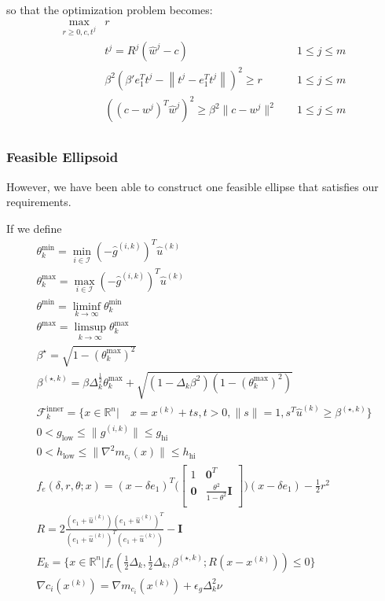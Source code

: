\documentclass{article}
\theoremstyle{case}
\newcommand{\dk}{\Delta_k}
\newcommand{\xk}{{x^{(k)}}}
\newcommand{\gik}{{g^{(i, k)}}}
\newcommand{\hgik}{{{\hat g}^{(i, k)}}}
\newcommand{\huk}{{{\hat u}^{(k)}}}
\newcommand{\bsk}{{\beta^{(\star, k)}}}
\newcommand{\bs}{{\beta^{\star}}}
\newcommand{\fcki}{{\mathcal {F}^{\text{inner}}_k}}
\newcommand{\rn}{{\mathbb R^{n}}}
\begin{document}
so that the optimization problem becomes:
\begin{align*}
\max_{r \ge 0, c, t^j}	& r & \\
					& t^j = R^j({\hat w}^j - c) 																		& \quad 1 \le j \le m \\
					& \beta^2 \left(\beta' e_1^T t^j - \left\|t^j - e_1^T t^j\right\|\right)^2 \ge r			& \quad 1 \le j \le m \\
					& \left(\left(c - w^j\right)^T\hat w^j\right)^2 \ge \beta^2 \|c - w^j\|^2											& \quad 1 \le j \le m \\
\end{align*}


\subsubsection{Feasible Ellipsoid}

However, we have been able to construct one feasible ellipse that satisfies our requirements.

If we define
\begin{align}
\theta^{\text{min}}_k = \min_{i \in \mathcal I} (-\hgik)^T \huk \label{def_theta_k_min} \\
\theta^{\text{max}}_k = \max_{i \in \mathcal I} (-\hgik)^T \huk \label{def_theta_k_max} \\
\theta^{\text{min}} = \liminf_{k\to\infty} \theta^{\text{min}}_k \label{def_theta_min} \\
\theta^{\text{max}} = \limsup_{k\to\infty} \theta^{\text{max}}_k \label{def_theta_max} \\
\bs = \sqrt{ 1 - (\theta^{\text{max}}_k)^2} \label{def_bs} \\
\bsk = \beta\dk^{\frac 1 2} \theta^{\text{max}}_k + \sqrt{(1 - \dk\beta^2)\left(1 - (\theta^{\text{max}}_k) ^2\right)} \label{def_bs_k} \\
\fcki = \{x \in \rn | \quad x = \xk + ts, t > 0, \|s\| = 1, s^T\huk \ge \bsk \} \label{feasible_cone} \\
0 < g_{\text{low}} \le \|\gik\| \le g_{\text{hi}} \label{def_g_bounds} \\
0 < h_{\text{low}} \le \|\nabla^2m_{c_i}(x)\| \le h_{\text{hi}} \label{def_h_bounds} \\
f_e(\delta, r, \theta; x) = (x - \delta e_1)^T\bigg(\begin{bmatrix}
1 & \boldsymbol0^T \\
\boldsymbol 0 & \frac{\theta^2}{1 - \theta^2} \boldsymbol I \\
\end{bmatrix}\bigg)(x - \delta e_1) - \frac 1 2 r^2 \label{def_ellipse_function} \\
R = 2\frac{(e_1 + \huk)(e_1 + \huk)^T}{(e_1 + \huk)^T(e_1 + \huk)} - \boldsymbol I \label{def_rotation} \\
E_k = \{x \in \rn | f_e\left(\frac 1 2 \dk, \frac 1 2 \dk, \bsk; R(x - \xk)\right) \le 0\} \label{def_ellipse_k} \\
\nabla c_i(\xk) = \nabla m_{c_i}(\xk) + \epsilon_{g}\dk^2\nu \label{def_lambda_poised} \\
\end{align}
\end{document}
